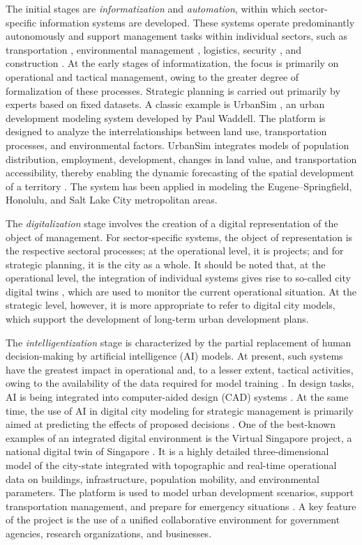 The initial stages are \emph{informatization} and \emph{automation}, within which sector-specific information systems are developed.
These systems operate predominantly autonomously and support management tasks within individual sectors, such as transportation \cite{x3}, environmental management \cite{x7}, logistics, security \cite{x2}, and construction \cite{x4}.
At the early stages of informatization, the focus is primarily on operational and tactical management, owing to the greater degree of formalization of these processes.
Strategic planning is carried out primarily by experts based on fixed datasets.
A classic example is UrbanSim \cite{x5}, an urban development modeling system developed by Paul Waddell.
The platform is designed to analyze the interrelationships between land use, transportation processes, and environmental factors.
UrbanSim integrates models of population distribution, employment, development, changes in land value, and transportation accessibility, thereby enabling the dynamic forecasting of the spatial development of a territory \cite{x5}.
The system has been applied in modeling the Eugene–Springfield, Honolulu, and Salt Lake City metropolitan areas.

The \emph{digitalization} stage involves the creation of a digital representation of the object of management.
For sector-specific systems, the object of representation is the respective sectoral processes; at the operational level, it is projects; and for strategic planning, it is the city as a whole.
It should be noted that, at the operational level, the integration of individual systems gives rise to so-called city digital twins \cite{x2}, which are used to monitor the current operational situation.
At the strategic level, however, it is more appropriate to refer to digital city models, which support the development of long-term urban development plans.

The \emph{intelligentization} stage is characterized by the partial replacement of human decision-making by artificial intelligence (AI) models.
At present, such systems have the greatest impact in operational and, to a lesser extent, tactical activities, owing to the availability of the data required for model training \cite{x4}.
In design tasks, AI is being integrated into computer-aided design (CAD) systems \cite{x5}.
At the same time, the use of AI in digital city modeling for strategic management is primarily aimed at predicting the effects of proposed decisions \cite{x6,x10}.
One of the best-known examples of an integrated digital environment is the Virtual Singapore project, a national digital twin of Singapore \cite{x9}.
It is a highly detailed three-dimensional model of the city-state integrated with topographic and real-time operational data on buildings, infrastructure, population mobility, and environmental parameters.
The platform is used to model urban development scenarios, support transportation management, and prepare for emergency situations \cite{x9}.
A key feature of the project is the use of a unified collaborative environment for government agencies, research organizations, and businesses.

